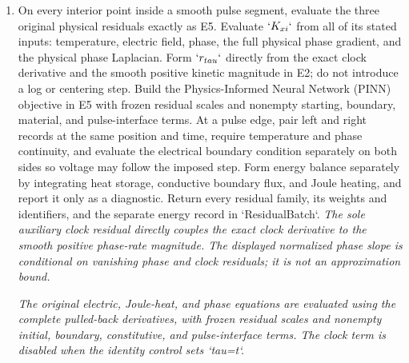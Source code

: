 \documentclass[10pt,a4paper]{article}
\begin{document}
\begin{enumerate}[leftmargin=*,start=3]
  \item On every interior point inside a smooth pulse segment, evaluate the three original physical residuals exactly as E5. Evaluate \(`K_{xi}`\) from all of its stated inputs: temperature, electric field, phase, the full physical phase gradient, and the physical phase Laplacian. Form \(`r_{tau}`\) directly from the exact clock derivative and the smooth positive kinetic magnitude in E2;\allowbreak{} do not introduce a log or centering step. Build the Physics-Informed Neural Network (PINN) objective in E5 with frozen residual scales and nonempty starting, boundary, material, and pulse-interface terms. At a pulse edge, pair left and right records at the same position and time, require temperature and phase continuity, and evaluate the electrical boundary condition separately on both sides so voltage may follow the imposed step. Form energy balance separately by integrating heat storage, conductive boundary flux, and Joule heating, and report it only as a diagnostic. Return every residual family, its weights and identifiers, and the separate energy record in `ResidualBatch`.
\noindent\emph{The sole auxiliary clock residual directly couples the exact clock derivative to the smooth positive phase-rate magnitude. The displayed normalized phase slope is conditional on vanishing phase and clock residuals;\allowbreak{} it is not an approximation bound.}
\par{}
\noindent\emph{The original electric, Joule-heat, and phase equations are evaluated using the complete pulled-back derivatives, with frozen residual scales and nonempty initial, boundary, constitutive, and pulse-interface terms. The clock term is disabled when the identity control sets `tau=t`.}

\end{enumerate}
\end{document}

